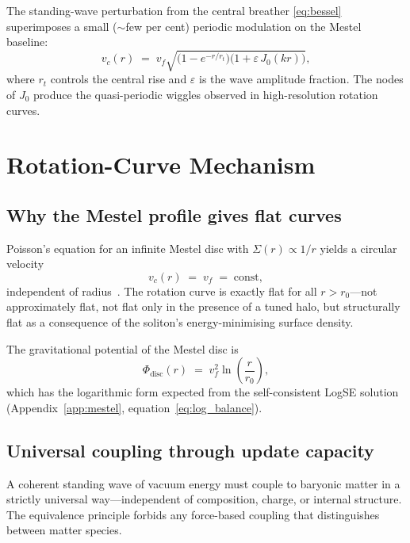 \documentclass[11pt,a4paper]{article}
\begin{document}
The standing-wave perturbation from the central breather \eqref{eq:bessel} superimposes a
small ($\sim$few per cent) periodic modulation on the Mestel baseline:
\begin{equation}
  v_c(r) \;=\; v_f
  \sqrt{\bigl(1-e^{-r/r_t}\bigr)\bigl(1 + \varepsilon\,J_0(kr)\bigr)},
  \label{eq:vwave}
\end{equation}
where $r_t$ controls the central rise and $\varepsilon$ is the wave amplitude fraction.
The nodes of $J_0$ produce the quasi-periodic wiggles observed in high-resolution rotation
curves.

\section{Rotation-Curve Mechanism}
\label{sec:mechanism}

\subsection{Why the Mestel profile gives flat curves}

Poisson's equation for an infinite Mestel disc with $\Sigma(r) \propto 1/r$ yields a
circular velocity
\begin{equation}
  v_c(r) \;=\; v_f \;=\; \text{const},
  \label{eq:flat}
\end{equation}
independent of radius~\cite{mestel1963}.  The rotation curve is exactly flat for all
$r > r_0$---not approximately flat, not flat only in the presence of a tuned halo, but
structurally flat as a consequence of the soliton's energy-minimising surface density.

The gravitational potential of the Mestel disc is
\begin{equation}
  \Phi_\mathrm{disc}(r) \;=\; v_f^2\ln\!\left(\frac{r}{r_0}\right),
  \label{eq:phi_mestel}
\end{equation}
which has the logarithmic form expected from the self-consistent LogSE solution
(Appendix~\ref{app:mestel}, equation~\eqref{eq:log_balance}).

\subsection{Universal coupling through update capacity}

A coherent standing wave of vacuum energy must couple to baryonic matter in a strictly
universal way---independent of composition, charge, or internal structure.  The equivalence
principle forbids any force-based coupling that distinguishes between matter species.
\end{document}
